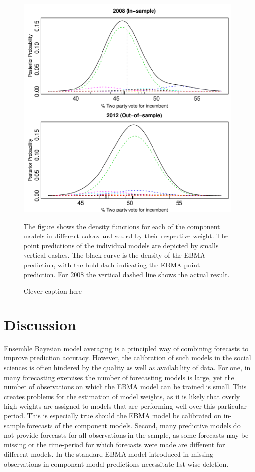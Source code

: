 \documentclass[12pt,fullpage,endnotes]{article}
\begin{document}
\begin{figure}[h]
\caption{Clever caption here}
\label{pres}
\begin{center}
\includegraphics[scale=.8]{presForecast}
\end{center}
The figure shows the density functions for each of the component models in different colors and scaled by their respective weight. The point predictions of the individual models are depicted by smalls vertical dashes. The black curve is the density of the EBMA prediction, with the bold dash indicating the EBMA point prediction. For 2008 the vertical dashed line shows the actual result.
\end{figure}





\section{Discussion} 
Ensemble Bayesian model averaging is a principled way of combining forecasts to improve prediction accuracy. However, the calibration of such models in the social sciences is often hindered by the quality as well as availability of data. For one, in many forecasting exercises the number of forecasting models is large, yet the number of observations on which the EBMA model can be trained is small. This creates problems for the estimation of model weights, as it is likely that overly high weights are assigned to models that are performing well over this particular period. This is especially true should the EBMA model be calibrated on in-sample forecasts of the component models. Second, many predictive models do not provide forecasts for all observations in the sample, as some forecasts may be missing or the time-period for which forecasts were made are different for different models. In the standard EBMA model introduced in \citet{mhw:2012} missing observations in component model predictions necessitate list-wise deletion. 
\end{document}
